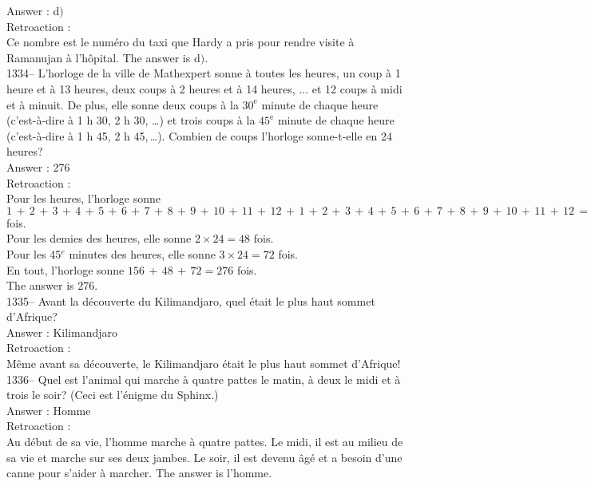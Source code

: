 ﻿\documentclass[letterpaper, 12pt]{article}
\begin{document}
Answer : d$)$\\

Retroaction : \\
Ce nombre est le num\'ero du taxi que Hardy a pris pour rendre
visite \`a Ramanujan \`a l'h\^opital.
The answer is  d$)$.\\


1334-- L'horloge de la ville de Mathexpert sonne \`a toutes les heures, un
coup \`a 1 heure et \`a 13 heures, deux  coups \`a 2 heures et \`a 14
heures, $\ldots$ et 12 coups \`a midi et \`a minuit.  De plus, elle sonne
deux coups \`a la $30^{\textrm{e}}$ minute de chaque heure (c'est-\`a-dire
\`a 1 h 30, 2 h 30, \ldots) et trois coups \`a la $45^{\textrm{e}}$ minute
de chaque heure (c'est-\`a-dire \`a 1 h 45, 2 h 45,\,\ldots).  Combien de
coups l'horloge sonne-t-elle en 24 heures?\\

Answer : 276\\

Retroaction :\\
Pour les heures, l'horloge sonne
$1\,+\,2\,+\,3\,+\,4\,+\,5\,+\,6\,+\,7\,+\,8\,+\,9\,+\,10\,+\,11\,+\,12\,+\,1\,+\,2\,+\,3\,+\,4\,+\,5\,+\,6\,+\,7\,+\,8\,+\,9\,+\,10\,+\,11\,+\,12\,=\,156$
fois.\\
Pour les demies des heures, elle sonne $2\times24=48$ fois.\\
Pour les 45$^e$ minutes des heures, elle sonne $3\times24=72$ fois.\\
En tout, l'horloge sonne $156\,+\,48\,+\,72=276$ fois.\\
The answer is 276.\\



1335-- Avant la d\'ecouverte du Kilimandjaro, quel \'etait le plus haut
sommet d'Afrique?\\

Answer : Kilimandjaro\\

Retroaction : \\
M\^eme avant sa d\'ecouverte, le Kilimandjaro \'etait le plus haut sommet
d'Afrique!\\

1336-- Quel est l'animal qui marche \`a quatre pattes le matin, \`a deux le
midi et \`a trois le soir?  (Ceci est l'\'enigme du Sphinx.)\\

Answer : Homme\\

Retroaction : \\
Au d\'ebut de sa vie, l'homme marche \`a quatre pattes.  Le midi, il est au
milieu de sa vie et marche sur ses deux jambes.  Le soir, il est devenu
\^ag\'e et a besoin d'une canne pour s'aider \`a marcher.  The answer is
l'homme.\\
\end{document}
